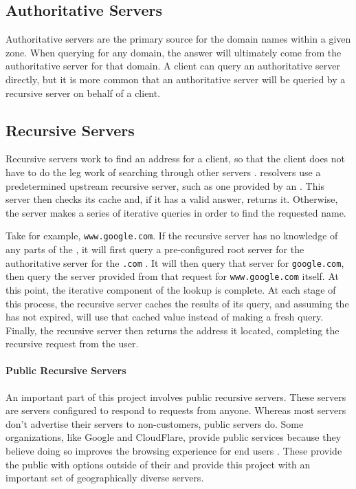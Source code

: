 \subsection{Authoritative Servers}
Authoritative servers are the primary source for the domain names within a given zone. When querying for any domain, the answer will ultimately come from the authoritative server for that domain. A \dns client can query an authoritative server directly, but it is more common that an authoritative server will be queried by a recursive server on behalf of a \dns client.

\subsection{Recursive Servers}
Recursive \dns servers work to find an \ip address for a client, so that the client does not have to do the leg work of searching through other \dns servers \cite{Cloudflarea}. \DNS resolvers use a predetermined upstream recursive \dns server, such as one provided by an \isp \cite{Oracle2010RecursiveWork}. This server then checks its cache and, if it has a valid answer, returns it. Otherwise, the server makes a series of iterative queries in order to find the requested name. 

Take for example, \texttt{www.google.com}. If the recursive server has no knowledge of any parts of the \acUrl, it will first query a pre-configured root \dns server for the authoritative server for the \texttt{.com} \tld. It will then query that server for \texttt{google.com}, then query the server provided from that request for \texttt{www.google.com} itself. At this point, the iterative component of the lookup is complete. At each stage of this process, the recursive server caches the results of its query, and assuming the \ttl has not expired, will use that cached value instead of making a fresh query. Finally, the recursive server then returns the \ip address it located, completing the recursive request from the user.

\paragraph{Public Recursive \dns Servers}
An important part of this project involves public recursive \dns servers. These servers are \dns servers configured to respond to requests from anyone. Whereas most \isp servers don't advertise their \dns servers to non-customers, public servers do. Some organizations, like Google and CloudFlare, provide public \dns services because they believe doing so improves the browsing experience for end users \cite{GoogleIntroductionDNS}. These provide the public with \dns options outside of their \isp and provide this project with an important set of geographically diverse servers.
